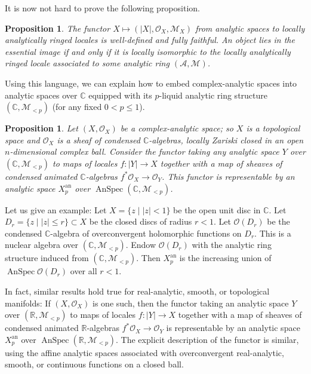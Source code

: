 \documentclass[11pt]{amsbook}
\DeclareMathOperator{\AnSpec}{AnSpec}
\numberwithin{equation}{section}
\numberwithin{theorem}{section}
\newtheorem{proposition}[theorem]{Proposition}
\theoremstyle{definition}
\begin{document}
It is now not hard to prove the following proposition.

\begin{proposition} The functor $X\mapsto (|X|,\mathcal O_X,\mathcal M_X)$ from analytic spaces to locally analytically ringed locales is well-defined and fully faithful. An object lies in the essential image if and only if it is locally isomorphic to the locally analytically ringed locale associated to some analytic ring $(\mathcal A,\mathcal M)$.
\end{proposition}

Using this language, we can explain how to embed complex-analytic spaces into analytic spaces over $\mathbb C$ equipped with its $p$-liquid analytic ring structure $(\mathbb C,\mathcal M_{<p})$ (for any fixed $0<p\leq 1$).

\begin{proposition} Let $(X,\mathcal O_X)$ be a complex-analytic space; so $X$ is a topological space and $\mathcal O_X$ is a sheaf of condensed $\mathbb C$-algebras, locally Zariski closed in an open $n$-dimensional complex ball. Consider the functor taking any analytic space $Y$ over $(\mathbb C,\mathcal M_{<p})$ to maps of locales $f: |Y|\to X$ together with a map of sheaves of condensed animated $\mathbb C$-algebras $f^\ast \mathcal O_X\to \mathcal O_Y$. This functor is representable by an analytic space $X_p^{\mathrm{an}}$ over $\AnSpec (\mathbb C,\mathcal M_{<p})$.
\end{proposition}

Let us give an example: Let $X=\{z\mid |z|<1\}$ be the open unit disc in $\mathbb C$. Let $D_r = \{z\mid |z|\leq r\}\subset X$ be the closed discs of radius $r<1$. Let $\mathcal O(D_r)$ be the condensed $\mathbb C$-algebra of overconvergent holomorphic functions on $D_r$. This is a nuclear algebra over $(\mathbb C,\mathcal M_{<p})$. Endow $\mathcal O(D_r)$ with the analytic ring structure induced from $(\mathbb C,\mathcal M_{<p})$. Then $X_p^{\mathrm{an}}$ is the increasing union of $\AnSpec \mathcal O(D_r)$ over all $r<1$.

In fact, similar results hold true for real-analytic, smooth, or topological manifolds: If $(X,\mathcal O_X)$ is one such, then the functor taking an analytic space $Y$ over $(\mathbb R,\mathcal M_{<p})$ to maps of locales $f: |Y|\to X$ together with a map of sheaves of condensed animated $\mathbb R$-algebras $f^\ast \mathcal O_X\to \mathcal O_Y$ is representable by an analytic space $X_p^{\mathrm{an}}$ over $\AnSpec(\mathbb R,\mathcal M_{<p})$. The explicit description of the functor is similar, using the affine analytic spaces associated with overconvergent real-analytic, smooth, or continuous functions on a closed ball.
\end{document}
